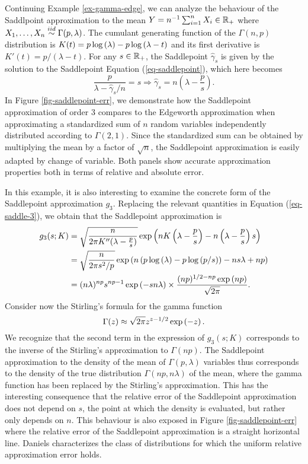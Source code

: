 \begin{example} \label{ex-gamma-saddle}
    Continuing Example \ref{ex-gamma-edge}, we can analyze the behaviour of the Saddlpoint approximation to the mean $Y = n^{-1}\sum_{i=1}^n X_i \in \mathbb{R}_+$ where $X_1, \ldots, X_n \stackrel{iid}{\sim} \Gamma(p, \lambda)$. The cumulant generating function of the $\Gamma(n, p)$ distribution is $K(t) = p\log\left(\lambda\right) - p\log\left(\lambda - t\right)$ and its first derivative is $K'(t) = p / (\lambda - t)$. For any $s \in \mathbb{R}_+$, the Saddlepoint $\hat\gamma_s$ is given by the solution to the Saddlepoint Equation (\ref{eq-saddlepoint}), which here becomes
    \begin{equation*}
        \frac{p}{\lambda - \hat\gamma_s/n} = s \Rightarrow \hat\gamma_s = n\left(\lambda - \frac{p}{s}\right).
    \end{equation*}
    In Figure \ref{fig-saddlepoint-err}, we demonstrate how the Saddlepoint approximation of order 3 compares to the Edgeworth approximation when approximating a standardized sum of $n$ random variables independently distributed according to $\Gamma(2, 1)$. Since the standardized sum can be obtained by multiplying the mean by a factor of $\sqrt{n}$, the Saddlepoint approximation is easily adapted by change of variable. Both panels show accurate approximation properties both in terms of relative and absolute error.
    
    In this example, it is also interesting to examine the concrete form of the Saddlepoint approximation $g_3$. Replacing the relevant quantities in Equation (\ref{eq-saddle-3}), we obtain that the Saddlepoint approximation is
    \begin{align*}
        g_3(s; K) &= \sqrt{\frac{n}{2\pi K''(\lambda - \frac{p}{s})}} \exp\left(nK\left(\lambda - \frac{p}{s}\right) - n\left(\lambda - \frac{p}{s}\right)s\right)\\
        &= \sqrt{\frac{n}{2\pi s^2/p}} \exp\left(n\left(p\log\left(\lambda\right) - p\log\left(p/s\right)\right) - ns\lambda + np\right)\\
        &= (n\lambda)^{np}s^{np-1}\exp\left(-sn\lambda\right) \times \frac{(np)^{1/2-np}\exp\left(np\right)}{\sqrt{2\pi}}.
    \end{align*}
    Consider now the Stirling's formula for the gamma function
    \begin{equation*}
        \Gamma(z) \approx \sqrt{2\pi}z^{z-1/2}\exp\left(-z\right).
    \end{equation*}
    We recognize that the second term in the expression of $g_3(s; K)$ corresponds to the inverse of the Stirling's approximation to $\Gamma(np)$. The Saddlepoint approximation to the density of the mean of $\Gamma(p, \lambda)$ variables thus corresponds to the density of the true distribution $\Gamma(np, n\lambda)$ of the mean, where the gamma function has been replaced by the Stirling's approximation. This has the interesting consequence that the relative error of the Saddlepoint approximation does not depend on $s$, the point at which the density is evaluated, but rather only depends on $n$. This behaviour is also exposed in Figure \ref{fig-saddlepoint-err} where the relative error of the Saddlepoint approximation is a straight horizontal line. Daniels \cite{daniels1954saddlepoint} characterizes the class of distributions for which the uniform relative approximation error holds.


\end{example}
